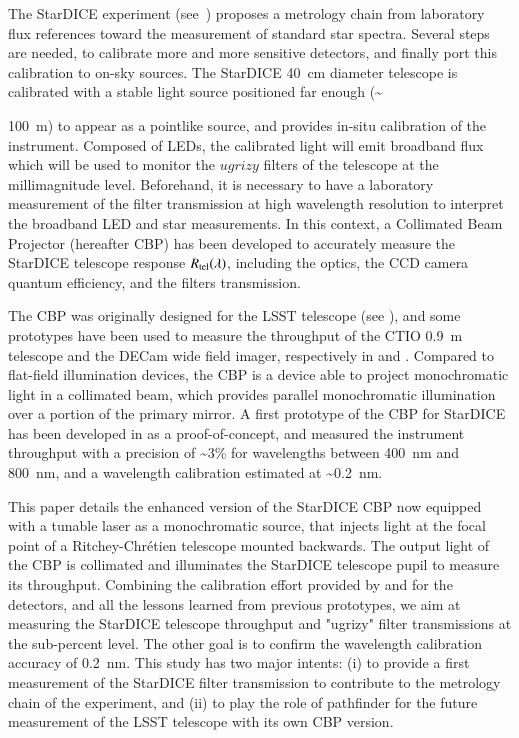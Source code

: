 The StarDICE experiment (see~\citealt{Betoule_2023}) proposes a metrology chain from laboratory flux references toward the measurement of standard star spectra. Several steps are needed, to calibrate more and more sensitive detectors, and finally port this calibration to on-sky sources. The StarDICE \SI{40}{\centi\meter} diameter telescope is calibrated with a stable light source positioned far enough (\textasciitilde {\SI{100}{\meter}) to appear as a pointlike source, and provides in-situ calibration of the instrument. Composed of LEDs, the calibrated light will emit broadband flux which will be used to monitor the $ugrizy$ filters of the \SD{} telescope at the millimagnitude level. Beforehand, it is necessary to have a laboratory measurement of the filter transmission at high wavelength resolution to interpret the broadband LED and star measurements. In this context, a Collimated Beam Projector (hereafter CBP) has been developed to accurately measure the StarDICE telescope response $R_{\mathrm{tel}}(\lambda)$, including the optics, the CCD camera quantum efficiency, and the filters transmission. 

The CBP was originally designed for the LSST telescope (see \citealt{ingraham2016}), and some prototypes have been used to measure the throughput of the CTIO \SI{0.9}{\meter} telescope and the DECam wide field imager, respectively in \cite{coughlin2018} and \cite{coughlin2016}. Compared to flat-field illumination devices, the CBP is a device able to project monochromatic light in a collimated beam, which provides parallel monochromatic illumination over a portion of the primary mirror. A first prototype of the CBP for StarDICE has been developed in \cite{Mondrik_2023} as a proof-of-concept, and measured the instrument throughput with a precision of \textasciitilde 3\% for wavelengths between \SI{400}{\nano\meter} and \SI{800}{\nano\meter}, and a wavelength calibration estimated at \textasciitilde \SI{0.2}{\nano\meter}. 

This paper details the enhanced version of the StarDICE CBP now equipped with a tunable laser as a monochromatic source, that injects light at the focal point of a Ritchey-Chrétien telescope mounted backwards. The output light of the CBP is collimated and illuminates the StarDICE telescope pupil to measure its throughput. Combining the calibration effort provided by \cite{houston2008detectors} and \cite{solarcell} for the detectors, and all the lessons learned from previous prototypes, we aim at measuring the StarDICE telescope throughput and "ugrizy" filter transmissions at the sub-percent level. The other goal is to confirm the wavelength calibration accuracy of \SI{0.2}{\nano\meter}. This study has two major intents: (i) to provide a first measurement of the StarDICE filter transmission to contribute to the metrology chain of the experiment, and (ii) to play the role of pathfinder for the future measurement of the LSST telescope with its own CBP version.

}
